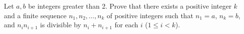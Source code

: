 Let $a,b$ be integers greater than 2. Prove that there exists a positive integer $k$ and a finite sequence $n_1,n_2,\ldots,n_k$ of positive integers such that $n_1=a$, $n_k=b$, and $n_in_{i+1}$ is divisible by $n_i+n_{i+1}$ for each $i$ ($1\leq i<k$).